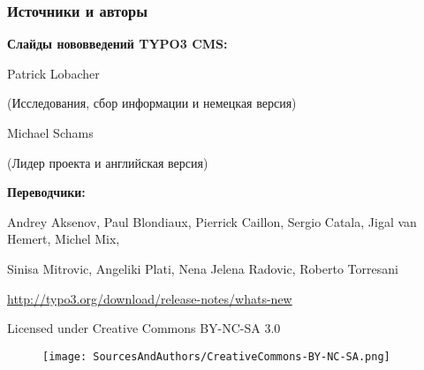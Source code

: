 \begin{frame}[fragile]
	\frametitle{Источники и авторы}

	\vspace{-0.6cm}

	\centerline{\textbf{Слайды нововведений TYPO3 CMS:}}

	\begin{center}
		\smaller
			\centerline{Patrick Lobacher}
			\centerline{(Исследования, сбор информации и немецкая версия)}
			\vspace{0.1cm}
			\centerline{Michael Schams}
			\centerline{(Лидер проекта и английская версия)}
		\normalsize
	\end{center}
	\vspace{-0.6cm}
	\begin{center}
		\smaller
			\centerline{\textbf{Переводчики:}}
			\centerline{Andrey Aksenov, Paul Blondiaux, Pierrick Caillon, Sergio Catala, Jigal van Hemert, Michel Mix,}
			\centerline{Sinisa Mitrovic, Angeliki Plati, Nena Jelena Radovic, Roberto Torresani}
		\normalsize
	\end{center}
	\vspace{-0.6cm}
	\smaller\begin{center}\url{http://typo3.org/download/release-notes/whats-new}\end{center}\normalsize

	\smaller\begin{center}Licensed under Creative Commons BY-NC-SA 3.0\end{center}\normalsize
	\begin{figure}\vspace*{-0.3cm}
		\texttt{[image: SourcesAndAuthors/CreativeCommons-BY-NC-SA.png]}
	\end{figure}

\end{frame}

